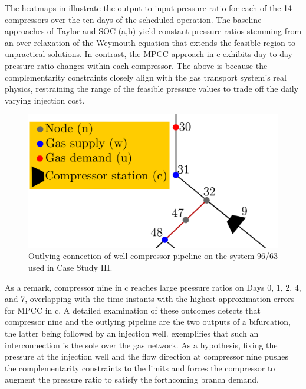 The heatmaps in  illustrate the output-to-input pressure ratio for each of the 14 compressors over the ten days of the scheduled operation. The baseline approaches of Taylor and SOC (a,b) yield constant pressure ratios stemming from an over-relaxation of the Weymouth equation that extends the feasible region to unpractical solutions. In contrast, the MPCC approach in c exhibits day-to-day pressure ratio changes within each compressor. The above is because the complementarity constraints closely align with the gas transport system's real physics, restraining the range of the feasible pressure values to trade off the daily varying injection cost.

\begin{figure}[h]
    \centering 
    \includegraphics[scale=1.1]{figures/Chapter_MPCC/partial_network}
    \caption{Outlying connection of well-compressor-pipeline on the system 96/63 used in Case Study III.}
    \label{fig:96 63partial network}
\end{figure}

As a remark, compressor nine in c reaches large pressure ratios on Days 0, 1, 2, 4, and 7, overlapping with the time instants with the highest approximation errors for MPCC in c. A detailed examination of these outcomes detects that compressor nine and the outlying pipeline are the two outputs of a bifurcation, the latter being followed by an injection well.  exemplifies that such an interconnection is the sole over the gas network. As a hypothesis, fixing the pressure at the injection well and the flow direction at compressor nine pushes the complementarity constraints to the limits and forces the compressor to augment the pressure ratio to satisfy the forthcoming branch demand.



